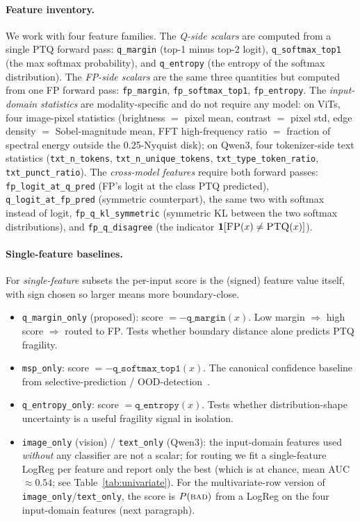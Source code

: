 \documentclass{article}
\newcommand{\fp}{\textsc{FP}\xspace}
\newcommand{\ptq}{\textsc{PTQ}\xspace}
\newcommand{\bad}{\textsc{bad}\xspace}
\begin{document}
\paragraph{Feature inventory.}
We work with four feature families. The \emph{Q-side scalars} are computed from a single \ptq{} forward pass: \texttt{q\_margin} (top-1 minus top-2 logit), \texttt{q\_softmax\_top1} (the max softmax probability), and \texttt{q\_entropy} (the entropy of the softmax distribution). The \emph{FP-side scalars} are the same three quantities but computed from one \fp{} forward pass: \texttt{fp\_margin}, \texttt{fp\_softmax\_top1}, \texttt{fp\_entropy}. The \emph{input-domain statistics} are modality-specific and do not require any model: on ViTs, four image-pixel statistics (brightness $=$ pixel mean, contrast $=$ pixel std, edge density $=$ Sobel-magnitude mean, FFT high-frequency ratio $=$ fraction of spectral energy outside the 0.25-Nyquist disk); on Qwen3, four tokenizer-side text statistics (\texttt{txt\_n\_tokens}, \texttt{txt\_n\_unique\_tokens}, \texttt{txt\_type\_token\_ratio}, \texttt{txt\_punct\_ratio}). The \emph{cross-model features} require both forward passes: \texttt{fp\_logit\_at\_q\_pred} (\fp{}'s logit at the class \ptq{} predicted), \texttt{q\_logit\_at\_fp\_pred} (symmetric counterpart), the same two with softmax instead of logit, \texttt{fp\_q\_kl\_symmetric} (symmetric KL between the two softmax distributions), and \texttt{fp\_q\_disagree} (the indicator $\mathbf{1}[\fp(x) \neq \ptq(x)]$).

\paragraph{Single-feature baselines.}
For \emph{single-feature} subsets the per-input score is the (signed) feature value itself, with sign chosen so larger means more boundary-close.
\begin{itemize}[leftmargin=*,topsep=2pt,itemsep=0pt]
\item \texttt{q\_margin\_only} (proposed): score $= -\texttt{q\_margin}(x)$. Low margin $\Rightarrow$ high score $\Rightarrow$ routed to \fp{}. Tests whether boundary distance alone predicts \ptq{} fragility.
\item \texttt{msp\_only}: score $= -\texttt{q\_softmax\_top1}(x)$. The canonical confidence baseline from selective-prediction / OOD-detection~\cite{hendrycks2017baseline,geifman2017selective}.
\item \texttt{q\_entropy\_only}: score $= \texttt{q\_entropy}(x)$. Tests whether distribution-shape uncertainty is a useful fragility signal in isolation.
\item \texttt{image\_only} (vision) / \texttt{text\_only} (Qwen3): the input-domain features used \emph{without} any classifier are not a scalar; for routing we fit a single-feature LogReg per feature and report only the best (which is at chance, mean AUC $\approx 0.54$; see Table~\ref{tab:univariate}). For the multivariate-row version of \texttt{image\_only}/\texttt{text\_only}, the score is $P(\bad)$ from a LogReg on the four input-domain features (next paragraph).
\end{itemize}
\end{document}
